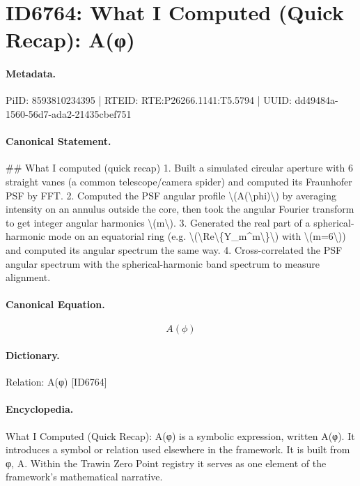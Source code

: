 \section*{ID6764: What I Computed (Quick Recap): A(φ)}
\paragraph{Metadata.}
PiID: 8593810234395 | RTEID: RTE:P26266.1141:T5.5794 | UUID: dd49484a-1560-56d7-ada2-21435cbef751

\paragraph{Canonical Statement.}
\#\# What I computed (quick recap) 1. Built a simulated circular aperture with 6 straight vanes (a common telescope/camera spider) and computed its Fraunhofer PSF by FFT. 2. Computed the PSF angular profile \textbackslash{}(A(\textbackslash{}phi)\textbackslash{}) by averaging intensity on an annulus outside the core, then took the angular Fourier transform to get integer angular harmonics \textbackslash{}(m\textbackslash{}). 3. Generated the real part of a spherical-harmonic mode on an equatorial ring (e.g. \textbackslash{}(\textbackslash{}Re\textbackslash{}\{Y\_m\textasciicircum{}m\textbackslash{}\}\textbackslash{}) with \textbackslash{}(m=6\textbackslash{})) and computed its angular spectrum the same way. 4. Cross-correlated the PSF angular spectrum with the spherical-harmonic band spectrum to measure alignment.

\paragraph{Canonical Equation.}
\[
A(\phi)
\]

\paragraph{Dictionary.}
Relation: A(φ) [ID6764]

\paragraph{Encyclopedia.}
What I Computed (Quick Recap): A(φ) is a symbolic expression, written A(φ). It introduces a symbol or relation used elsewhere in the framework. It is built from φ, A. Within the Trawin Zero Point registry it serves as one element of the framework's mathematical narrative.
